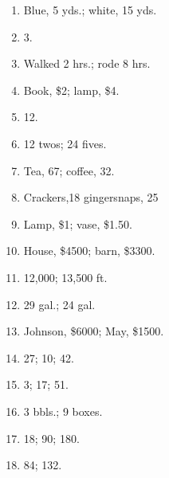 \documentclass{book}
\begin{document}
\begin{enumerate}

\item Blue, 5 yds.; white, 15 yds.

\item 3.

\item Walked 2 hrs.; rode 8 hrs.

\item Book, \$2; lamp, \$4.

\item 12.

\item 12 twos; 24 fives.

\item Tea, 67; coffee, 32.

\item Crackers,18 gingersnaps, 25

\item Lamp,  \$1; vase, \$1.50.

\item House, \$4500; barn, \$3300.

\item 12,000; 13,500 ft.

\item 29 gal.; 24 gal.

\item Johnson, \$6000; May, \$1500.

\item 27; 10; 42.

\item 3; 17; 51.

\item 3 bbls.; 9 boxes.

\item 18; 90; 180.

\item 84; 132.

\end{enumerate}
\end{document}
